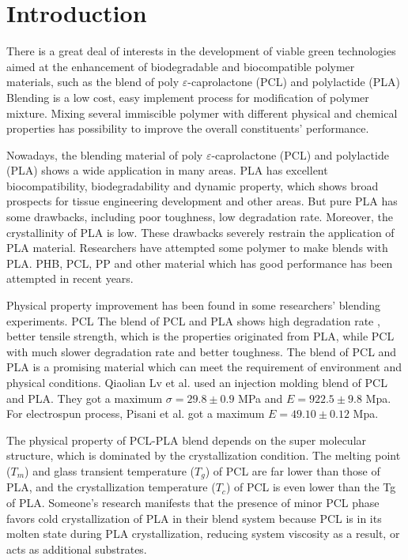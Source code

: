 \documentclass{article}%
\author{Fanyunyi}
\begin{document}
\linenumbers
\tableofcontents
  \enabstract{
  \lipsum[1]
  }
\section{Introduction} %
  There is a great deal of interests in the development of viable green technologies aimed at the enhancement of biodegradable and biocompatible polymer materials, such as the blend of poly $\varepsilon$-caprolactone (PCL) and polylactide (PLA)
  Blending is a low cost, easy implement process for modification of polymer mixture.
  Mixing several immiscible polymer with different physical and chemical properties has possibility to improve the overall constituents' performance. 


  Nowadays, the blending material of poly $\varepsilon$-caprolactone (PCL) and polylactide (PLA) shows a wide application in many areas. 
  PLA has excellent biocompatibility, biodegradability and dynamic property, which shows broad prospects for tissue engineering development and other areas. 
  But pure PLA has some drawbacks, including poor toughness, low degradation rate.
  Moreover, the crystallinity of PLA is low.
  These drawbacks severely restrain the application of PLA material. 
  Researchers have attempted some polymer to make blends with PLA. 
  PHB, PCL, PP and other material which has good performance has been attempted in recent years. %


  Physical property improvement has been found in some researchers'  blending experiments. 
  PCL 
  The blend of PCL and PLA shows high degradation rate , better tensile strength, which is the properties originated from PLA, while PCL with much slower degradation rate and better toughness.
  The blend of PCL and PLA is a promising material which can meet the requirement of environment and physical conditions.
  Qiaolian Lv et al.\cite{RN73} used an injection molding blend of PCL and PLA.
  They got a maximum $\sigma=29.8\pm0.9$ MPa and $E=922.5\pm9.8$ Mpa. 
  For electrospun process, Pisani et al.\cite{RN58} got a maximum $E=49.10\pm0.12$ Mpa.


  The physical property of PCL-PLA blend depends on the super molecular structure, which is dominated by the crystallization condition.
  The melting point ($T_m$) and glass transient temperature ($T_g$) of PCL are far lower than those of PLA, and the crystallization temperature ($T_c$) of PCL is even lower than the Tg of PLA. 
  Someone's research manifests that the presence of minor PCL phase favors cold crystallization of PLA in their blend system because PCL is in its molten state during PLA crystallization, reducing system viscosity as a result, or acts as additional substrates.
\end{document}
